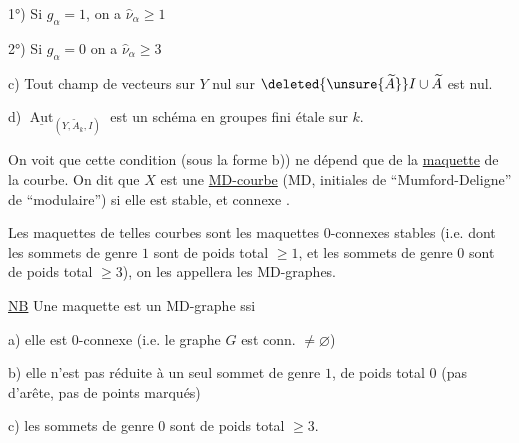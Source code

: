 1°) Si $g_\alpha=1$, on a $\widehat\nu_\alpha\geq1$

2°) Si $g_\alpha=0$ on a $\widehat\nu_\alpha\geq3$

c) Tout champ de vecteurs sur $Y$ nul sur $\deleted{\unsure{\widetilde A}}I\cup\widetilde A$ est nul.

d) $\underline{\operatorname{Aut}}_{(Y,\widetilde A_k,I)}$ est un schéma en groupes fini étale sur $k$.

On voit que cette condition (sous la forme b)) ne dépend que de la \uline{maquette} de la courbe. On dit que $X$ est une \uline{MD-courbe} (MD, initiales de ``Mumford-Deligne''  de ``modulaire'') si elle est stable, et connexe .

Les maquettes de telles courbes sont les maquettes $0$-connexes  stables (i.e. dont les sommets de genre $1$ sont de poids total $\geq1$, et les sommets de genre $0$ sont de poids total $\geq3$), on les appellera les MD-graphes.

\uline{NB} Une maquette est un MD-graphe ssi

a) elle est $0$-connexe (i.e. le graphe $G$ est conn. $\neq\varnothing$)

b) elle n'est pas réduite à un seul sommet de genre $1$, de poids total $0$ (pas d'arête, pas de points marqués)

c) les sommets de genre $0$ sont de poids total $\geq3$.
